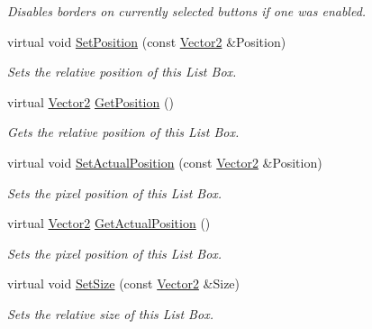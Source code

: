 \begin{DoxyCompactItemize}
\begin{DoxyCompactList}\small\item\em Disables borders on currently selected buttons if one was enabled. \item\end{DoxyCompactList}\item 
virtual void \hyperlink{classphys_1_1UI_1_1ListBox_a0c4c7141142caca342157ce4460b907d}{SetPosition} (const \hyperlink{classphys_1_1Vector2}{Vector2} \&Position)
\begin{DoxyCompactList}\small\item\em Sets the relative position of this List Box. \item\end{DoxyCompactList}\item 
virtual \hyperlink{classphys_1_1Vector2}{Vector2} \hyperlink{classphys_1_1UI_1_1ListBox_af688db0628a5588865a890584f754b02}{GetPosition} ()
\begin{DoxyCompactList}\small\item\em Gets the relative position of this List Box. \item\end{DoxyCompactList}\item 
virtual void \hyperlink{classphys_1_1UI_1_1ListBox_a4bf1911c639429c783915ba8a543fec3}{SetActualPosition} (const \hyperlink{classphys_1_1Vector2}{Vector2} \&Position)
\begin{DoxyCompactList}\small\item\em Sets the pixel position of this List Box. \item\end{DoxyCompactList}\item 
virtual \hyperlink{classphys_1_1Vector2}{Vector2} \hyperlink{classphys_1_1UI_1_1ListBox_a44046453283fb2c54e10dc868705352a}{GetActualPosition} ()
\begin{DoxyCompactList}\small\item\em Sets the pixel position of this List Box. \item\end{DoxyCompactList}\item 
virtual void \hyperlink{classphys_1_1UI_1_1ListBox_a2e1f6514f83be768dad7e357beb6ac98}{SetSize} (const \hyperlink{classphys_1_1Vector2}{Vector2} \&Size)
\begin{DoxyCompactList}\small\item\em Sets the relative size of this List Box. \item\end{DoxyCompactList}\item 

\end{DoxyCompactItemize}
